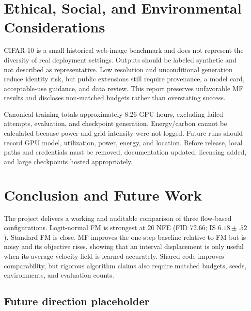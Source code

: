 \documentclass{iutbscthesis}
\begin{document}
\chapter{Ethical, Social, and Environmental Considerations}
CIFAR-10 is a small historical web-image benchmark and does not represent the diversity of real deployment settings. Outputs should be labeled synthetic and not described as representative. Low resolution and unconditional generation reduce identity risk, but public extensions still require provenance, a model card, acceptable-use guidance, and data review. This report preserves unfavorable MF results and discloses non-matched budgets rather than overstating success.

Canonical training totals approximately 8.26 GPU-hours, excluding failed attempts, evaluation, and checkpoint generation. Energy/carbon cannot be calculated because power and grid intensity were not logged. Future runs should record GPU model, utilization, power, energy, and location. Before release, local paths and credentials must be removed, documentation updated, licensing added, and large checkpoints hosted appropriately.

\chapter{Conclusion and Future Work}
The project delivers a working and auditable comparison of three flow-based configurations. Logit-normal FM is strongest at 20 NFE (FID 72.66; IS $6.18\pm.52$). Standard FM is close. MF improves the one-step baseline relative to FM but is noisy and its objective rises, showing that an interval displacement is only useful when its average-velocity field is learned accurately. Shared code improves comparability, but rigorous algorithm claims also require matched budgets, seeds, environments, and evaluation counts.

\section{Future direction placeholder}
\end{document}
